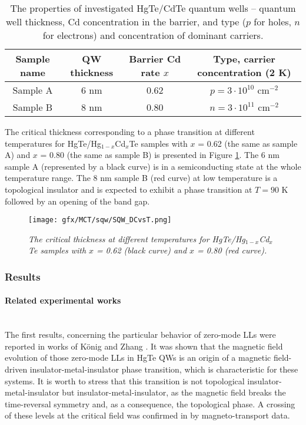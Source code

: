 \documentclass[titlepage,a4paper]{book}
\newcommand{\wciecie}{\quad\phantom{v}}
\newcommand{\myparagraph}[1]{\paragraph{#1}\mbox{}\\}
\begin{document}
\begin{table}[h]
\label{tab:MCT_QW_properties}
\caption{The properties of investigated HgTe/CdTe quantum wells -- quantum well thickness, Cd concentration in the barrier, and type ($p$ for holes, $n$ for electrons) and concentration of dominant carriers.}
\vspace{10pt}
\centering
\begin{tabular}{ c | c | c | c}	
\textbf{Sample name} & \textbf{QW thickness} & \textbf{Barrier Cd rate $x$} & \textbf{Type, carrier concentration (2 K)}\\
\hline\hline
Sample A & 6 nm & 0.62 & $p = 3\cdot10^{10}$ cm$^{-2}$\\ \hline
Sample B & 8 nm & 0.80 & $n = 3\cdot10^{11}$ cm$^{-2}$\\ \hline\hline 
\end{tabular}
\end{table}

The critical thickness corresponding to a phase transition at different temperatures for HgTe/Hg$_{1-x}$Cd$_{x}$Te samples with $x$ = 0.62 (the same as sample A) and $x$ = 0.80 (the same as sample B) is presented in Figure \ref{fig:SQW_DCvsT}. The 6 nm sample A (represented by a black curve) is in a semiconducting state at the whole temperature range. The 8 nm sample B (red curve) at low temperature is a topological insulator and is expected to exhibit a phase transition at $T = 90$ K followed by an opening of the band gap.

\begin{figure}[H]
	\centering
	\texttt{[image: gfx/MCT/sqw/SQW\_DCvsT.png]}
	\vspace{-10pt}
	\caption{\textit{The critical thickness at different temperatures for HgTe/Hg$_{1-x}$Cd$_{x}$Te samples with $x$ = 0.62 (black curve) and $x$ = 0.80 (red curve).}}
	\label{fig:SQW_DCvsT}
\end{figure} 

\subsubsection{Results}
\label{sec:MCT_QW}
\myparagraph{Related experimental works}
\wciecie
The first results, concerning the particular behavior of zero-mode LLs were reported in works of König \cite{Konig_Topology} and Zhang \cite{Zhang_Topology}. It was shown that the magnetic field evolution of those zero-mode LLs in HgTe QWs is an origin of a magnetic field-driven insulator-metal-insulator phase transition, which is characteristic for these systems. It is worth to stress that this transition is not topological insulator-metal-insulator but insulator-metal-insulator, as the magnetic field breaks the time-reversal symmetry and, as a consequence, the topological phase. A crossing of these levels at the critical field was confirmed in \cite{Konig_Topology} by magneto-transport data.
\end{document}

